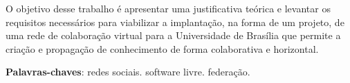 \begin{resumo}
O objetivo desse trabalho é apresentar uma justificativa teórica e levantar
os requisitos necessários para viabilizar a implantação, na forma de um
projeto, de uma rede de colaboração virtual para a Universidade de Brasília
que permite a criação e propagação de conhecimento de forma colaborativa
e horizontal.

 \vspace{\onelineskip}
    
 \noindent
 \textbf{Palavras-chaves}: redes sociais. software livre. federação.
\end{resumo}

